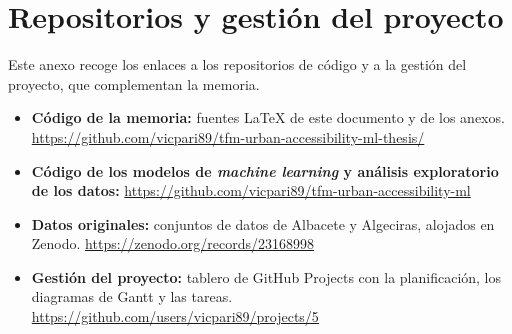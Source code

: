 \chapter{Repositorios y gestión del proyecto}
\label{anx:repositorios}

Este anexo recoge los enlaces a los repositorios de código y a la gestión del proyecto, que complementan la memoria.

\begin{itemize}
  \item \textbf{Código de la memoria:} fuentes \LaTeX{} de este documento y de los anexos. \url{https://github.com/vicpari89/tfm-urban-accessibility-ml-thesis/}
  \item \textbf{Código de los modelos de \emph{machine learning} y análisis exploratorio de los datos:} \url{https://github.com/vicpari89/tfm-urban-accessibility-ml}
  \item \textbf{Datos originales:} conjuntos de datos de Albacete y Algeciras, alojados en Zenodo. \url{https://zenodo.org/records/23168998}
  \item \textbf{Gestión del proyecto:} tablero de GitHub Projects con la planificación, los diagramas de Gantt y las tareas. \url{https://github.com/users/vicpari89/projects/5}
\end{itemize}
